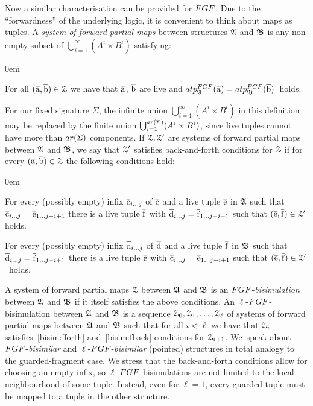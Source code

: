 \noindent
Now a similar characterisation can be provided for $\FGF$. 
Due to the ``forwardness'' of the underlying logic, it is convenient to think about maps as tuples.
A \emph{system of forward partial maps} between structures ${\mathfrak{A}}$ and ${\mathfrak{B}}$ is any non-empty subset of $\bigcup_{i=1}^{\infty} (A^i \times B^i)$ satisfying:
\begin{description}\itemsep0em
  \item[\desclabel{(AtomicEq)}{bisim:atomiceq}] For all $(\overline{\mathrm{a}}, \overline{\mathrm{b}}) \in \mathcal{Z}$ we have that $\overline{\mathrm{a}}$, $\overline{\mathrm{b}}$ are live and $\atp{\FGF}{\str{A}}{\elemtuplea} = \atp{\FGF}{\str{B}}{\elemtupleb}$~holds.
\end{description}
For our fixed signature $\Sigma$, the infinite union $\bigcup_{i=1}^{\infty} (A^i \times B^i)$ in this definition may be replaced by the finite union $\bigcup_{i=1}^{\arity(\Sigma)} (A^i \times B^i)$, since live tuples cannot have more than $\arity(\Sigma)$ components.
If $\mathcal{Z}, \mathcal{Z}'$ are systems of forward partial maps between ${\mathfrak{A}}$ and ${\mathfrak{B}}$, we say that $\mathcal{Z}'$ satisfies back-and-forth conditions for $\mathcal{Z}$ if for every $(\overline{\mathrm{a}}, \overline{\mathrm{b}}) \in \mathcal{Z}$ the following conditions hold:
\begin{description}\itemsep0em
  \item[\desclabel{(fForth)}{bisim:fforth}] For every (possibly empty) infix $\overline{\mathrm{c}}_{i\ldots j}$ of $\overline{\mathrm{c}}$ and a live tuple $\overline{\mathrm{e}}$ in ${\mathfrak{A}}$ such that $\overline{\mathrm{c}}_{i\ldots j} = \overline{\mathrm{e}}_{1\ldots j{-}i{+}1}$ there is a live tuple $\overline{\mathrm{f}}$ with $\overline{\mathrm{d}}_{i\ldots j} = {\overline{\mathrm{f}}}_{1\dots j{-}i{+}1}$ such that $(\overline{\mathrm{e}}, \overline{\mathrm{f}}) \in \mathcal{Z}'$ holds.
  \item[\desclabel{(fBack)}{bisim:fback}] For every (possibly empty) infix $\overline{\mathrm{d}}_{i\ldots j}$ of $\overline{\mathrm{d}}$ and a live tuple $\overline{\mathrm{f}}$ in ${\mathfrak{B}}$ such that $\overline{\mathrm{d}}_{i\ldots j} = {\overline{\mathrm{f}}}_{1\dots j{-}i{+}1}$ there is a live tuple $\overline{\mathrm{e}}$ with $\overline{\mathrm{c}}_{i\ldots j} = \overline{\mathrm{e}}_{1\ldots j{-}i{+}1}$ such that $(\overline{\mathrm{e}}, \overline{\mathrm{f}}) \in \mathcal{Z}'$~holds.
\end{description}
A system of forward partial maps $\mathcal{Z}$ between ${\mathfrak{A}}$ and ${\mathfrak{B}}$ is an $\FGF$-\emph{bisimulation} between ${\mathfrak{A}}$ and ${\mathfrak{B}}$ if it itself satisfies the above conditions.
An $\ell$-$\FGF$-bisimulation between ${\mathfrak{A}}$ and ${\mathfrak{B}}$ is a sequence $\mathcal{Z}_0, \mathcal{Z}_1, \ldots, \mathcal{Z}_\ell$ of systems of forward partial maps between ${\mathfrak{A}}$ and ${\mathfrak{B}}$ such that for all $i < \ell$ we have that $\mathcal{Z}_i$ satisfies~\ref{bisim:fforth} and~\ref{bisim:fback} conditions for $\mathcal{Z}_{i{+}1}$.
We~speak about $\FGF$-\emph{bisimilar} and $\ell$-$\FGF$-\emph{bisimilar} (pointed) structures in total analogy to the guarded-fragment case.
We stress that the back-and-forth conditions allow for choosing an empty infix, so $\ell$-$\FGF$-bisimulations are not limited to the local neighbourhood of some tuple.
Instead, even for $\ell = 1$, every guarded tuple must be mapped to a tuple in the other structure.

